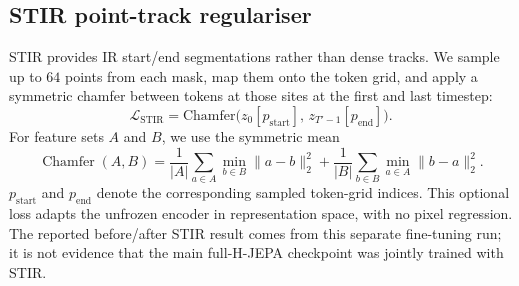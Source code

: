 \documentclass[preprint,12pt]{elsarticle}
\begin{document}
\subsection{STIR point-track regulariser}
STIR provides IR start/end segmentations rather than dense tracks.
We sample up to $64$ points from each mask, map them onto the token grid, and apply a symmetric chamfer between tokens at those sites at the first and last timestep:
\begin{equation}
\mathcal{L}_{\mathrm{STIR}}
=
\mathrm{Chamfer}\bigl(z_{0}[p_{\mathrm{start}}],\, z_{T'-1}[p_{\mathrm{end}}]\bigr).
\label{eq:stir}
\end{equation}
For feature sets $A$ and $B$, we use the symmetric mean
\begin{equation*}
\operatorname{Chamfer}(A,B)
=
\frac{1}{|A|}\sum_{a\in A}\min_{b\in B}\|a-b\|_2^2
+
\frac{1}{|B|}\sum_{b\in B}\min_{a\in A}\|b-a\|_2^2 .
\end{equation*}
$p_{\mathrm{start}}$ and
$p_{\mathrm{end}}$ denote the corresponding sampled token-grid indices.
This optional loss adapts the unfrozen encoder in representation space, with
no pixel regression. The reported before/after STIR result comes from this
separate fine-tuning run; it is not evidence that the main full-H-JEPA
checkpoint was jointly trained with STIR.
\end{document}
